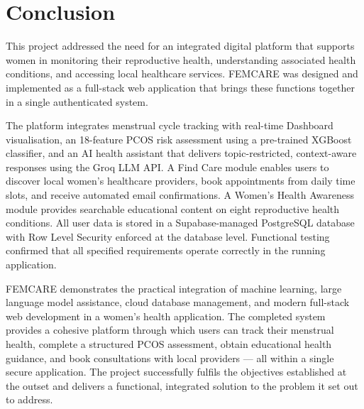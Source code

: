 
\chapter{Conclusion}\doublespacing
\label{chap:conclusion}

This project addressed the need for an integrated digital platform that supports women in monitoring their reproductive health, understanding associated health conditions, and accessing local healthcare services. FEMCARE was designed and implemented as a full-stack web application that brings these functions together in a single authenticated system.

The platform integrates menstrual cycle tracking with real-time Dashboard visualisation, an 18-feature PCOS risk assessment using a pre-trained XGBoost classifier, and an AI health assistant that delivers topic-restricted, context-aware responses using the Groq LLM API. A Find Care module enables users to discover local women's healthcare providers, book appointments from daily time slots, and receive automated email confirmations. A Women's Health Awareness module provides searchable educational content on eight reproductive health conditions. All user data is stored in a Supabase-managed PostgreSQL database with Row Level Security enforced at the database level. Functional testing confirmed that all specified requirements operate correctly in the running application.

FEMCARE demonstrates the practical integration of machine learning, large language model assistance, cloud database management, and modern full-stack web development in a women's health application. The completed system provides a cohesive platform through which users can track their menstrual health, complete a structured PCOS assessment, obtain educational health guidance, and book consultations with local providers --- all within a single secure application. The project successfully fulfils the objectives established at the outset and delivers a functional, integrated solution to the problem it set out to address.
